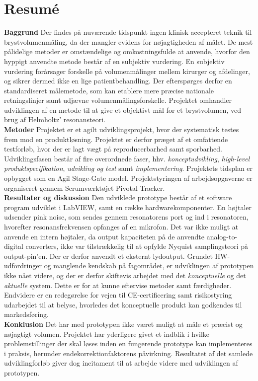 \section*{Resumé}

\textbf{Baggrund} Der findes på nuværende tidspunkt ingen klinisk accepteret teknik til brystvolumenmåling, da der mangler evidens for nøjagtigheden af målet. De mest pålidelige metoder er omstændelige og omkostningsfulde at anvende, hvorfor den hyppigt anvendte metode består af en subjektiv vurdering. En subjektiv vurdering forårsager forskelle på volumenmålinger mellem kirurger og afdelinger, og sikrer dermed ikke en lige patientbehandling. Der efterspørges derfor en standardiseret målemetode, som kan etablere mere præcise nationale retningslinjer samt udjævne volumenmålingsforskelle. Projektet omhandler udviklingen af en metode til at give et objektivt mål for et brystvolumen, ved brug af Helmholtz' resonansteori. \\
\textbf{Metoder} Projektet er et agilt udviklingsprojekt, hvor der systematisk testes frem mod en produktløsning. Projektet er derfor præget af et omfattende testforløb, hvor der er lagt vægt på reproducerbarhed samt sporbarhed. 
Udviklingsfasen består af fire overordnede faser, hhv. \textit{konceptudvikling}, \textit{high-level produktspecifikation}, \textit{udvikling og test} samt \textit{implementering}.
Projektets tidsplan er opbygget som en Agil Stage-Gate model. Projektstyringen af arbejdsopgaverne er organiseret gennem Scrumværktøjet Pivotal Tracker.\\
\textbf{Resultater og diskussion} Den udviklede prototype består af et software program udviklet i LabVIEW, samt en række hardwarekomponenter. En højtaler udsender pink noise, som sendes gennem resonatorens port og ind i resonatoren, hvorefter resonansfrekvensen opfanges af en mikrofon. Det var ikke muligt at anvende en intern højtaler, da output kapaciteten på de anvendte analog-to-digital converters, ikke var tilstrækkelig til at opfylde Nyquist samplingsteori på output-pin'en. Der er derfor anvendt et eksternt lydoutput. Grundet HW-udfordringer og manglende kendskab på fagområdet, er udviklingen af prototypen ikke nået videre, og der er derfor skiftevis arbejdet med det \textit{konceptuelle} og det \textit{aktuelle} system. Dette er for at kunne eftervise metoder samt færdigheder. 
Endvidere er en redegørelse for vejen til CE-certificering samt risikostyring udarbejdet til at belyse, hvorledes det konceptuelle produkt kan godkendes til markedsføring.\\
\textbf{Konklusion} Det har med prototypen ikke været muligt at måle et præcist og nøjagtigt volumen. Projektet har yderligere givet et indblik i hvilke problemstillinger der skal løses inden en fungerende prototype kan implementeres i praksis, herunder endekorrektionfaktorens påvirkning. Resultatet af det samlede udviklingforløb giver dog incitament til at arbejde videre med udviklingen af prototypen.   
